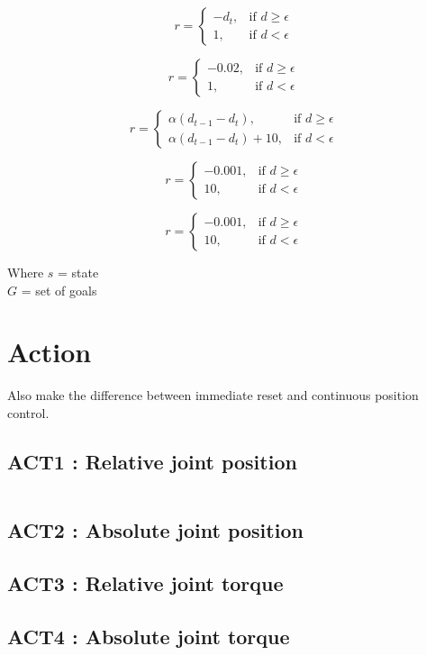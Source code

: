 \documentclass{article}
\begin{document}
\begin{equation}
r = \begin{cases}
    - d_t , & \text{if $d \geq \epsilon $}\\
    1 , & \text{if $d < \epsilon $}
  \end{cases}
\end{equation}

\begin{equation}
r = \begin{cases}
    - 0.02 , & \text{if $d \geq \epsilon $}\\
    1 , & \text{if $d < \epsilon $}
  \end{cases}
\end{equation}

\begin{equation}
r = \begin{cases}
\alpha (d_{t-1} - d_t), & \text{if $d \geq \epsilon $}\\
\alpha (d_{t-1} - d_t) + 10, & \text{if $d < \epsilon $}
  \end{cases}
\end{equation}

\begin{equation}
r = \begin{cases}
    - 0.001 , & \text{if $d \geq \epsilon $}\\
    10 , & \text{if $d < \epsilon $}
  \end{cases}
\end{equation}


\begin{equation}
r = \begin{cases}
    - 0.001 , & \text{if $d \geq \epsilon $}\\
    10 , & \text{if $d < \epsilon $}
  \end{cases}
\end{equation}

Where
$s$ = state \\
$G$ = set of goals \\


\section{Action}

Also make the difference between immediate reset and continuous position control.

\subsection*{ACT1 : Relative joint position}

\begin{equation}
[\delta_1, delta_2, delta_3, delta_4, delta_5, delta_6]
\end{equation}

\subsection*{ACT2 : Absolute joint position}

\subsection*{ACT3 : Relative joint torque}

\subsection*{ACT4 : Absolute joint torque}
\end{document}
